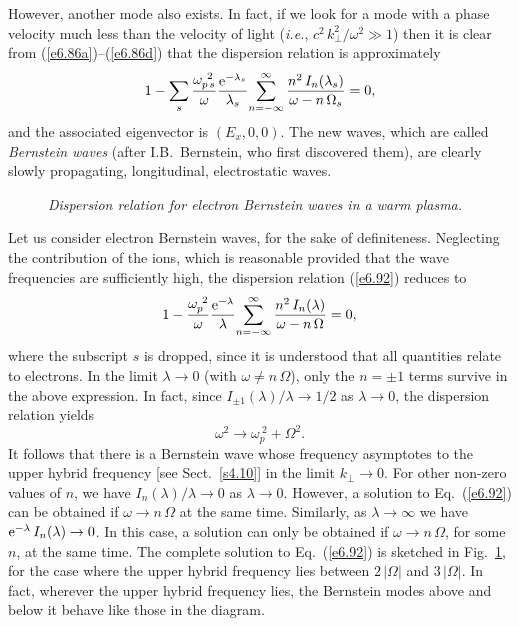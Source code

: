 However, another mode also exists. In fact, if we look for a mode with a
phase velocity much less than the velocity of light ({\em i.e.}, 
$c^2\,k_\perp^2/\omega^2\gg 1$) then it is clear from (\ref{e6.86a})--(\ref{e6.86d})  that
the dispersion relation is approximately
\begin{equation}\label{e6.92}
1 - \sum_s\frac{\omega_{p\,s}^{~2}}{\omega}
\frac{{\rm e}^{-\lambda_s}}{\lambda_s} \!\sum_{n=-\infty}^\infty \frac{n^2\,I_n(
\lambda_s)}{\omega-n\,{\Omega}_s} = 0,
\end{equation}
and the associated eigenvector is $(E_x, 0, 0)$. The new waves, which
are called {\em Bernstein waves}\/ (after I.B.~Bernstein, who first
discovered them), are clearly slowly propagating, 
longitudinal, electrostatic waves.

\begin{figure}
\epsfysize=4in
\centerline{}
\caption{\em Dispersion relation for electron Bernstein waves in a warm plasma.}\label{f37}
\end{figure}

Let us consider  electron Bernstein waves, for the sake of definiteness. 
Neglecting the contribution of the ions, which is reasonable provided that
the wave frequencies are sufficiently high, the dispersion relation (\ref{e6.92})
reduces to 
\begin{equation}
1 - \frac{\omega_{p}^{~2}}{\omega}
\frac{{\rm e}^{-\lambda}}{\lambda} \!\sum_{n=-\infty}^\infty \frac{n^2\,I_n(
\lambda)}{\omega-n\,{\Omega}} = 0,
\end{equation}
where the subscript $s$ is dropped, since it is understood that all
quantities relate to electrons. In the limit  $\lambda\rightarrow 0$ (with
$\omega\neq n\,{\Omega}$), only the $n=\pm 1$ terms survive in the
above expression. In fact, since $I_{\pm 1}(\lambda)/\lambda \rightarrow
1/2$ as $\lambda\rightarrow 0$, the dispersion relation yields
\begin{equation}
\omega^2\rightarrow \omega_p^{~2} + {\Omega}^2.
\end{equation}
It follows that there is a Bernstein wave whose frequency asymptotes
to the upper hybrid frequency [see Sect.~\ref{s4.10}] in the limit $k_\perp
\rightarrow 0$. For other non-zero values of $n$, we have $I_n(\lambda)/\lambda
\rightarrow 0$ as $\lambda\rightarrow 0$. However, a solution to Eq.~(\ref{e6.92}) can
be obtained if $\omega\rightarrow n\,{\Omega}$ at the same time. Similarly,
as $\lambda\rightarrow\infty$ we have ${\rm e}^{-\lambda}\,I_n(\lambda)\rightarrow
0$. In this case, a solution can only be obtained if $\omega\rightarrow
n\,{\Omega}$, for some $n$, at the same time. The complete solution to
Eq.~(\ref{e6.92}) is sketched in Fig.~\ref{f37}, for the case where the upper
hybrid frequency lies between $2\,|{\Omega}|$ and $3\,|{\Omega}|$. 
In fact, wherever the upper hybrid frequency lies, the Bernstein modes above
and below it behave like those in the diagram.

